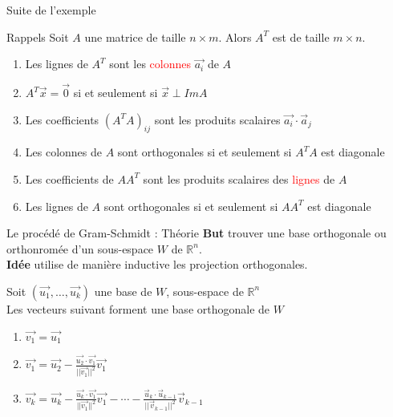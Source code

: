 

\begin{parag}{Suite de l'exemple}
    
\end{parag}
\begin{parag}{Rappels}
    Soit $A$ une matrice de taille 
    $n \times m$. Alors $A^T$ est de taille $m \times n$.
    \begin{enumerate}
        \item Les lignes de $A^T$ sont les \textcolor{red}{colonnes} $\vec{a_i}$ de $A$
        \item $A^T\vec{x} = \vec{0}$ si et seulement si $\vec{x} \perp ImA$
        \item Les coefficients $(A^TA)_{ij}$ sont les produits scalaires $\vec{a_i} \cdot \vec{a}_j$
        \item Les colonnes de $A$ sont orthogonales si et seulement si $A^TA$ est diagonale
        \item Les coefficients de $AA^T$ sont les produits scalaires des \textcolor{red}{lignes} de $A$
        \item Les lignes de $A$ sont orthogonales si et seulement si $AA^T$ est diagonale
    \end{enumerate}
\end{parag}

\begin{parag}{Le procédé de Gram-Schmidt : Théorie}
    \textbf{But} trouver une base orthogonale ou orthonromée d'un sous-espace $W$ de $\mathbb{R}^n$.
    \\
    \textbf{Idée} utilise de manière inductive les projection orthogonales.
    \begin{theoreme}
        Soit $(\vec{u_1}, \dots, \vec{u_k})$ une base de $W$, sous-espace de $\mathbb{R}^n$\\
        Les vecteurs suivant forment une base orthogonale de $W$
        \begin{enumerate}
            \item $\vec{v_1} = \vec{u_1}$
            \item $\vec{v_1} = \vec{u_2} - \frac{\vec{u_2}\cdot \vec{v_1}}{||\vec{v_1}||^2}\vec{v_1}$
            \item $\vec{v_k} = \vec{u_k} - \frac{\vec{u_k}\cdot\vec{v_1}}{||\vec{v_1}||^2}\vec{v_1} - \cdots - \frac{\vec{u}_k\cdot\vec{u}_{k-1}}{||\vec{v}_{k-1}||^2}\vec{v}_{k-1}$
        \end{enumerate}
    \end{theoreme}
\end{parag}

